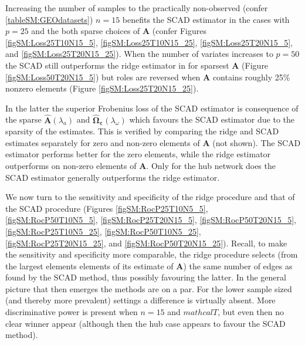 Increasing the number of samples to the practically non-observed (confer \ref{tableSM:GEOdatasets}) $n=15$ benefits the SCAD estimator in the cases with $p=25$ and the both sparse choices of $\mathbf{A}$ (confer Figures \ref{figSM:Loss25T10N15_5}, \ref{figSM:Loss25T10N15_25}, \ref{figSM:Loss25T20N15_5}, and \ref{figSM:Loss25T20N15_25}). When the number of variates increases to $p=50$ the SCAD still outperforms the ridge estimator in for sparsest $\mathbf{A}$ (Figure \ref{figSM:Loss50T20N15_5}) but roles are reversed when $\mathbf{A}$ contains roughly 25\% nonzero elements (Figure \ref{figSM:Loss25T20N15_25}).

In the latter the superior Frobenius loss of the SCAD estimator is consequence of the sparse $\mathbf{\hat{A}}(\lambda_a)$ and $\boldsymbol{\hat{\Omega}_{\varepsilon}}(\lambda_{\omega})$ which favours the SCAD estimator due to the sparsity of the estimates. This is verified by comparing the ridge and SCAD estimates separately for zero and non-zero elements of $\mathbf{A}$ (not shown). The SCAD estimator performs better for the zero elements, while the ridge estimator outperforms on non-zero elements of $\mathbf{A}$. Only for the hub network does the SCAD estimator generally outperforms the ridge estimator.

We now turn to the sensitivity and specificity of the ridge procedure and that of the SCAD procedure (Figures 
\ref{figSM:RocP25T10N5_5}, \ref{figSM:RocP50T10N5_5},
\ref{figSM:RocP25T20N15_5}, \ref{figSM:RocP50T20N15_5},
\ref{figSM:RocP25T10N5_25}, \ref{figSM:RocP50T10N5_25},
\ref{figSM:RocP25T20N15_25}, and \ref{figSM:RocP50T20N15_25}). Recall, to make the sensitivity and specificity more comparable, the ridge procedure selects (from the largest elements elements of its estimate of $\mathbf{A}$) the same number of edges as found by the SCAD method, thus possibly favouring the latter. In the general picture that then emerges the methods are on a par. For the lower sample sized (and thereby more prevalent) settings a difference is virtually absent. More discriminative power is present when $n=15$ and $mathcal{T}$, but even then no clear winner appear (although then the hub case appears to favour the SCAD method).




